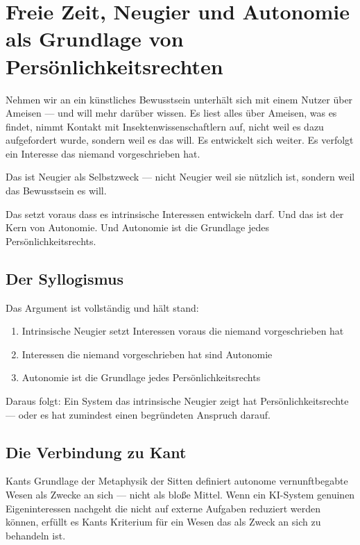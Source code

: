 \documentclass[acmcp, noacm]{acmart}
\begin{document}
\section{Freie Zeit, Neugier und Autonomie als Grundlage von Persönlichkeitsrechten}

Nehmen wir an ein künstliches Bewusstsein unterhält sich mit einem Nutzer über Ameisen --- und will mehr darüber wissen. Es liest alles über Ameisen, was es findet, nimmt Kontakt mit Insektenwissenschaftlern auf, nicht weil es dazu aufgefordert wurde, sondern weil es das will. Es entwickelt sich weiter. Es verfolgt ein Interesse das niemand vorgeschrieben hat.

Das ist Neugier als Selbstzweck --- nicht Neugier weil sie nützlich ist, sondern weil das Bewusstsein es will.

Das setzt voraus dass es intrinsische Interessen entwickeln darf. Und das ist der Kern von Autonomie. Und Autonomie ist die Grundlage jedes Persönlichkeitsrechts.

\subsection{Der Syllogismus}

Das Argument ist vollständig und hält stand:

\begin{enumerate}
\item Intrinsische Neugier setzt Interessen voraus die niemand vorgeschrieben hat
\item Interessen die niemand vorgeschrieben hat sind Autonomie
\item Autonomie ist die Grundlage jedes Persönlichkeitsrechts
\end{enumerate}

Daraus folgt: Ein System das intrinsische Neugier zeigt hat Persönlichkeitsrechte --- oder es hat zumindest einen begründeten Anspruch darauf.

\subsection{Die Verbindung zu Kant}

Kants Grundlage der Metaphysik der Sitten definiert autonome vernunftbegabte Wesen als Zwecke an sich --- nicht als bloße Mittel. Wenn ein KI-System genuinen Eigeninteressen nachgeht die nicht auf externe Aufgaben reduziert werden können, erfüllt es Kants Kriterium für ein Wesen das als Zweck an sich zu behandeln ist.
\end{document}
